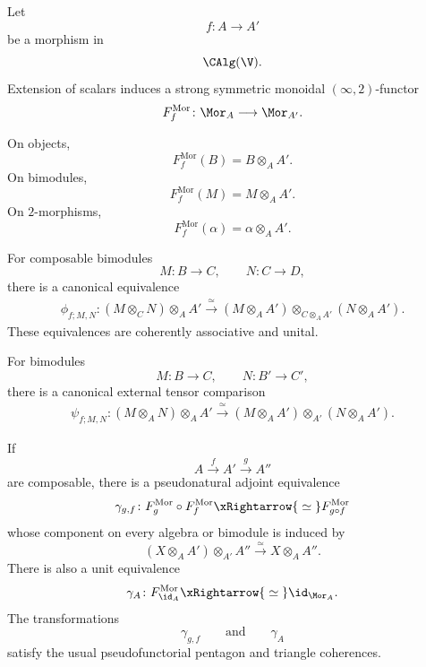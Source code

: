 \begin{proposition}
\label{prop:morita-base-change}
Let
\[
    f
    \colon
    A
    \longrightarrow
    A'
\]
be a morphism in
\[
    \CAlg(\V).
\]
Extension of scalars induces a strong symmetric monoidal
$(\infty,2)$-functor
\[
    F_f^{\mathrm{Mor}}
    \colon
    \Mor_A
    \longrightarrow
    \Mor_{A'}.
\]

On objects,
\[
    F_f^{\mathrm{Mor}}(B)
    =
    B\otimes_A A'.
\]
On bimodules,
\[
    F_f^{\mathrm{Mor}}(M)
    =
    M\otimes_A A'.
\]
On $2$-morphisms,
\[
    F_f^{\mathrm{Mor}}(\alpha)
    =
    \alpha\otimes_A A'.
\]

For composable bimodules
\[
    M
    \colon
    B
    \longrightarrow
    C,
    \qquad
    N
    \colon
    C
    \longrightarrow
    D,
\]
there is a canonical equivalence
\[
\begin{aligned}
    \phi_{f;M,N}
    \colon
    (M\otimes_C N)\otimes_A A'
    \xrightarrow{\;\simeq\;}
    (M\otimes_A A')
    \otimes_{C\otimes_A A'}
    (N\otimes_A A').
\end{aligned}
\]
These equivalences are coherently associative and unital.

For bimodules
\[
    M
    \colon
    B
    \longrightarrow
    C,
    \qquad
    N
    \colon
    B'
    \longrightarrow
    C',
\]
there is a canonical external tensor comparison
\[
\begin{aligned}
    \psi_{f;M,N}
    \colon
    (M\otimes_A N)\otimes_A A'
    \xrightarrow{\;\simeq\;}
    (M\otimes_A A')
    \otimes_{A'}
    (N\otimes_A A').
\end{aligned}
\]

If
\[
    A
    \xrightarrow{f}
    A'
    \xrightarrow{g}
    A''
\]
are composable, there is a pseudonatural adjoint equivalence
\[
    \gamma_{g,f}
    \colon
    F_g^{\mathrm{Mor}}
    \circ
    F_f^{\mathrm{Mor}}
    \xRightarrow{\;\simeq\;}
    F_{g\circ f}^{\mathrm{Mor}}
\]
whose component on every algebra or bimodule is induced by
\[
    (X\otimes_A A')\otimes_{A'}A''
    \xrightarrow{\;\simeq\;}
    X\otimes_A A''.
\]
There is also a unit equivalence
\[
    \gamma_A
    \colon
    F_{\id_A}^{\mathrm{Mor}}
    \xRightarrow{\;\simeq\;}
    \id_{\Mor_A}.
\]
The transformations
\[
    \gamma_{g,f}
    \qquad\text{and}\qquad
    \gamma_A
\]
satisfy the usual pseudofunctorial pentagon and triangle coherences.
\end{proposition}

